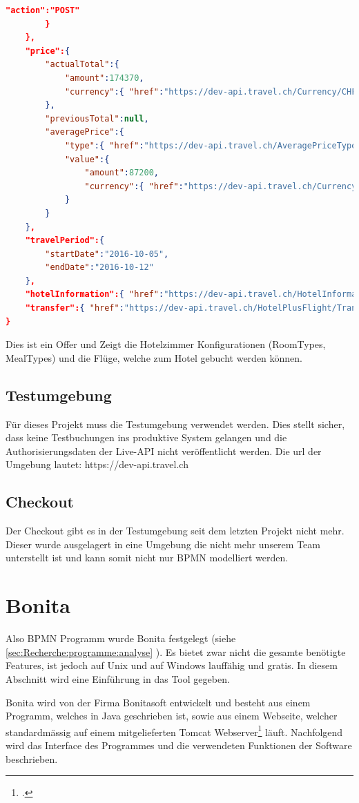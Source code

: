 \begin{lstlisting}[language=json,firstnumber=1]
            "action":"POST"
        }
    },
    "price":{
        "actualTotal":{
            "amount":174370,
            "currency":{ "href":"https://dev-api.travel.ch/Currency/CHF" }
        },
        "previousTotal":null,
        "averagePrice":{
            "type":{ "href":"https://dev-api.travel.ch/AveragePriceType/PerPerson" },
            "value":{
                "amount":87200,
                "currency":{ "href":"https://dev-api.travel.ch/Currency/CHF" }
            }
        }
    },
    "travelPeriod":{
        "startDate":"2016-10-05",
        "endDate":"2016-10-12"
    },
    "hotelInformation":{ "href":"https://dev-api.travel.ch/HotelInformation/46FFEA61-6A24-4FCB-AE6A-524CE6E752DF" },
    "transfer":{ "href":"https://dev-api.travel.ch/HotelPlusFlight/Transfer/NotIncluded" }
}
\end{lstlisting}
Dies ist ein Offer und Zeigt die Hotelzimmer Konfigurationen (RoomTypes, MealTypes) und die Flüge, welche zum Hotel gebucht werden können.

\subsection{Testumgebung}
Für dieses Projekt muss die Testumgebung verwendet werden. Dies stellt sicher, dass keine Testbuchungen ins produktive System gelangen und die Authorisierungsdaten der Live-API nicht veröffentlicht werden.
Die \gls{url} der Umgebung lautet: https://dev-api.travel.ch

\subsection{Checkout}
Der Checkout gibt es in der Testumgebung seit dem letzten Projekt nicht mehr. Dieser wurde ausgelagert in eine Umgebung die nicht mehr unserem Team unterstellt ist und kann somit nicht nur BPMN modelliert werden.

\section{Bonita}
Also BPMN Programm wurde Bonita festgelegt (siehe \cref{sec:Recherche:programme:analyse} ). Es bietet zwar nicht die gesamte benötigte Features, ist jedoch auf Unix und auf Windows lauffähig und gratis. In diesem Abschnitt wird eine Einführung in das Tool gegeben. 

Bonita wird von der Firma Bonitasoft entwickelt und besteht aus einem Programm, welches in Java geschrieben ist, sowie aus einem Webseite, welcher standardmässig auf einem mitgelieferten Tomcat Webserver\footcite{Tomcat_2016-06-12} läuft.
Nachfolgend wird das Interface des Programmes und die verwendeten Funktionen der Software beschrieben.

